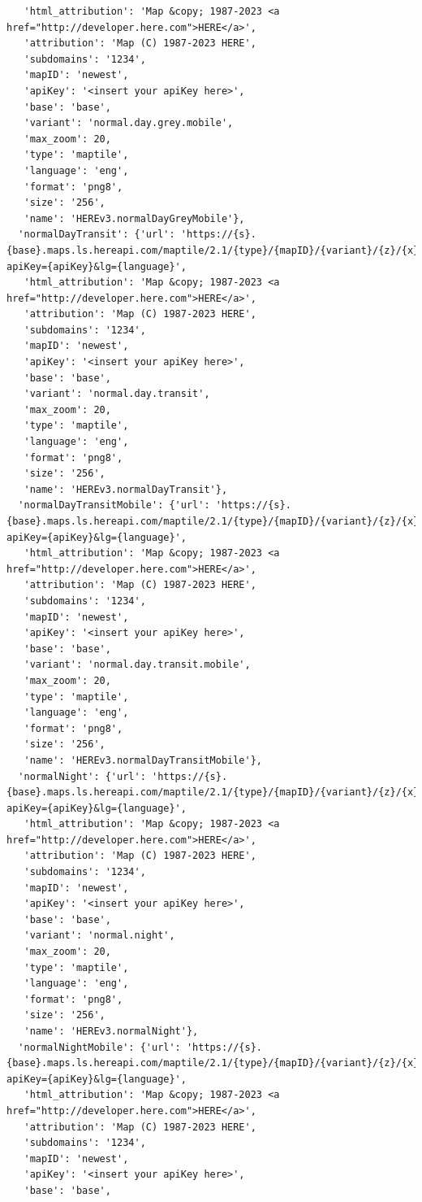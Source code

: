 \documentclass[
  letterpaper,
  DIV=11,
  numbers=noendperiod]{scrreprt}
\begin{document}
\begin{verbatim}
   'html_attribution': 'Map &copy; 1987-2023 <a href="http://developer.here.com">HERE</a>',
   'attribution': 'Map (C) 1987-2023 HERE',
   'subdomains': '1234',
   'mapID': 'newest',
   'apiKey': '<insert your apiKey here>',
   'base': 'base',
   'variant': 'normal.day.grey.mobile',
   'max_zoom': 20,
   'type': 'maptile',
   'language': 'eng',
   'format': 'png8',
   'size': '256',
   'name': 'HEREv3.normalDayGreyMobile'},
  'normalDayTransit': {'url': 'https://{s}.{base}.maps.ls.hereapi.com/maptile/2.1/{type}/{mapID}/{variant}/{z}/{x}/{y}/{size}/{format}?apiKey={apiKey}&lg={language}',
   'html_attribution': 'Map &copy; 1987-2023 <a href="http://developer.here.com">HERE</a>',
   'attribution': 'Map (C) 1987-2023 HERE',
   'subdomains': '1234',
   'mapID': 'newest',
   'apiKey': '<insert your apiKey here>',
   'base': 'base',
   'variant': 'normal.day.transit',
   'max_zoom': 20,
   'type': 'maptile',
   'language': 'eng',
   'format': 'png8',
   'size': '256',
   'name': 'HEREv3.normalDayTransit'},
  'normalDayTransitMobile': {'url': 'https://{s}.{base}.maps.ls.hereapi.com/maptile/2.1/{type}/{mapID}/{variant}/{z}/{x}/{y}/{size}/{format}?apiKey={apiKey}&lg={language}',
   'html_attribution': 'Map &copy; 1987-2023 <a href="http://developer.here.com">HERE</a>',
   'attribution': 'Map (C) 1987-2023 HERE',
   'subdomains': '1234',
   'mapID': 'newest',
   'apiKey': '<insert your apiKey here>',
   'base': 'base',
   'variant': 'normal.day.transit.mobile',
   'max_zoom': 20,
   'type': 'maptile',
   'language': 'eng',
   'format': 'png8',
   'size': '256',
   'name': 'HEREv3.normalDayTransitMobile'},
  'normalNight': {'url': 'https://{s}.{base}.maps.ls.hereapi.com/maptile/2.1/{type}/{mapID}/{variant}/{z}/{x}/{y}/{size}/{format}?apiKey={apiKey}&lg={language}',
   'html_attribution': 'Map &copy; 1987-2023 <a href="http://developer.here.com">HERE</a>',
   'attribution': 'Map (C) 1987-2023 HERE',
   'subdomains': '1234',
   'mapID': 'newest',
   'apiKey': '<insert your apiKey here>',
   'base': 'base',
   'variant': 'normal.night',
   'max_zoom': 20,
   'type': 'maptile',
   'language': 'eng',
   'format': 'png8',
   'size': '256',
   'name': 'HEREv3.normalNight'},
  'normalNightMobile': {'url': 'https://{s}.{base}.maps.ls.hereapi.com/maptile/2.1/{type}/{mapID}/{variant}/{z}/{x}/{y}/{size}/{format}?apiKey={apiKey}&lg={language}',
   'html_attribution': 'Map &copy; 1987-2023 <a href="http://developer.here.com">HERE</a>',
   'attribution': 'Map (C) 1987-2023 HERE',
   'subdomains': '1234',
   'mapID': 'newest',
   'apiKey': '<insert your apiKey here>',
   'base': 'base',

\end{verbatim}
\end{document}
